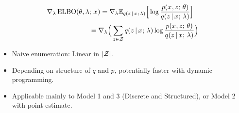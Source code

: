 \begin{frame}

\begin{align*}
 \nabla_{\lambda} \operatorname*{ELBO}(\theta, \lambda &; \, x^{}) = \nabla_{\lambda} \mathbb{E}_{ q(z \,|\, x^{} ; \, \lambda)} \Big[ \log \frac{p(x^{}, z ; \, \theta)}{q(z \,|\, x^{} ; \, \lambda)} \Big]\\
 & =  \nabla_{\lambda} \Big( \sum_{z \in \mathcal{Z}}q(z \,|\, x^{} ; \, \lambda) \log \frac{p(x^{}, z ; \, \theta)}{q(z \,|\, x^{} ; \, \lambda)} \Big)
 \end{align*}

\begin{itemize}
    \item Naive enumeration: Linear in $|\mathcal{Z}|$.
    \pause
    \item Depending on structure of $q$ and $p$, potentially faster with dynamic programming.
    \item Applicable mainly to Model 1 and 3 (Discrete and Structured), or Model 2 with 
    point estimate. 
\end{itemize}
\end{frame}




